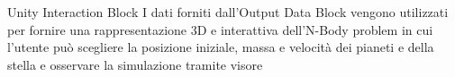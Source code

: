 \begin{frame}{Unity Interaction Block}
    I dati forniti dall'Output Data Block vengono utilizzati per fornire una rappresentazione 3D e interattiva dell'N-Body problem in cui l'utente può scegliere la posizione iniziale, massa e velocità dei pianeti e della stella e osservare la simulazione tramite visore 
\end{frame}
